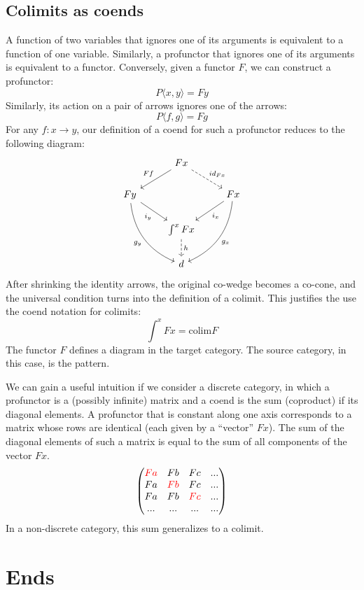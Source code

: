\documentclass[DaoFP]{subfiles}
\begin{document}
\subsection{Colimits as coends}
A function of two variables that ignores one of its arguments is equivalent to a function of one variable. Similarly, a profunctor that ignores one of its arguments is equivalent to a functor. Conversely, given a functor $F$, we can construct a profunctor:
\[P \langle x, y \rangle = F y \]
Similarly, its action on a pair of arrows ignores one of the arrows:
\[P \langle f, g \rangle = F g \]
For any   $f \colon x \to y$, our definition of a coend for such a profunctor reduces to the following diagram:
\[
 \begin{tikzcd}
 & F x
 \arrow[ld, "F f"']
 \arrow[rd, dashed, "id_{F x}"]
 \\
 F y
 \arrow[dr, "i_y"']
 \arrow[ddr, bend right,  "g_y"']
 && F x
 \arrow[dl, "i_x"]
 \arrow[ddl, bend left,  "g_x"]
 \\
 &\int^x F x
 \arrow[d, dashed, "h"]
 \\
 &d
 \end{tikzcd}
\]
After shrinking the identity arrows, the original co-wedge becomes a co-cone, and the universal condition turns into the definition of a colimit. This justifies the use the coend notation for colimits:
\[ \int^x F x = \text{colim} F \]
The functor $F$ defines a diagram in the target category. The source category, in this case, is the pattern.

We can gain a useful intuition if we consider a discrete category, in which a profunctor is a (possibly infinite) matrix and a coend is the sum (coproduct) if its diagonal elements. A profunctor that is constant along one axis corresponds to a matrix whose rows are identical (each given by a ``vector'' $F x$). The sum of the diagonal elements of such a matrix is equal to the sum of all components of the vector $F x$.
\[
\begin{pmatrix}
\color{red} F a & F b & F c & ... \\
F a & \color{red}F b & F c & ...\\
F a & F b &\color{red}F c & ...\\
... & ... & ... & ...
\end{pmatrix}
\]
In a non-discrete category, this sum generalizes to a colimit.
\section{Ends}
\end{document}
